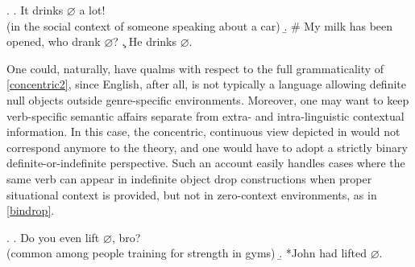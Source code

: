 \ex. \label{concentric} \a. \label{concentric1} It drinks $\varnothing$ a lot! \\ (in the social context of someone speaking about a car)
\b. \label{concentric2} \# My milk has been opened, who drank $\varnothing$?
\c. \label{concentric3} He drinks $\varnothing$.

One could, naturally, have qualms with respect to the full grammaticality of \ref{concentric2}, since English, after all, is not typically a language allowing definite null objects outside genre-specific environments. Moreover, one may want to keep verb-specific semantic affairs separate from extra- and intra-linguistic contextual information. In this case, the concentric, continuous view depicted in  would not correspond anymore to the theory, and one would have to adopt a strictly binary definite-or-indefinite perspective. Such an account easily handles cases where the same verb can appear in indefinite object drop constructions when proper situational context is provided, but not in zero-context environments, as in \ref{bindrop}.

\ex. \label{bindrop} \a. \label{bindrop1} Do you even lift $\varnothing$, bro? \hfill \parencite[9]{Glass2020} \\ (common among people training for strength in gyms)
\b. \label{bindrop2} *John had lifted $\varnothing$.

